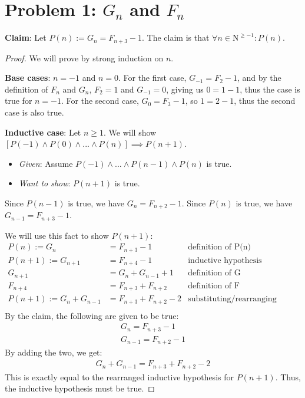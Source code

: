 \documentclass[titlepage]{article}
\begin{document}
 \maketitle

\section{Problem 1: $G_n$ and $F_n$}

\textbf{Claim}: Let $P(n) := G_n = F_{n+3} - 1$.  The claim is that $\forall n \in \mathrm{N}^{\geq -1}: P(n)$.

\begin{proof}
We will prove by strong induction on $n$.

\textbf{Base cases}: $n=-1$ and $n=0$.  For the first case, $G_{-1} = F_{2}-1$, and by the definition of $F_n$ and $G_n$, $F_2 = 1$ and $G_{-1} = 0$, giving us $0 = 1 - 1$, thus the case is true for $n=-1$. For the second case, $G_0 = F_3 - 1$, so $1 = 2 - 1$, thus the second case is also true.


\textbf{Inductive case}: Let $n \geq 1$.  We will show $[P(-1) \land P(0) \land ... \land P(n)] \implies P(n+1)$.
\begin{itemize}
\item \emph{Given}: Assume $P(-1) \land ... \land P(n-1) \land P(n)$ is true.
\item \emph{Want to show}: $P(n+1)$ is true.
\end{itemize}
Since $P(n-1)$ is true, we have
$G_{n} = F_{n+2} - 1$.
Since $P(n)$ is true, we have
$G_{n-1} = F_{n+3} - 1$.

We will use this fact to show $P(n+1)$:
\begin{align*}
P(n) := G_{n} &= F_{n+3} - 1 & \text{definition of P(n)} \\
P(n+1) := G_{n+1} &= F_{n+4} - 1 & \text{inductive hypothesis} \\
G_{n+1} &= G_n + G_{n-1} + 1 & \text{definition of G} \\
F_{n+4} &= F_{n+3} + F_{n+2} & \text{definition of F} \\
P(n+1) := G_n + G_{n-1}&= F_{n+3} + F_{n+2} - 2 & \text{substituting/rearranging terms} \\
\end{align*}
By the claim, the following are given to be true:\\
\begin{align*}
G_{n} = F_{n+3} - 1 \\ 
G_{n-1} = F_{n+2} - 1
\end{align*}
By adding the two, we get:\\
\begin{align*}
G_n + G_{n-1}= F_{n+3} + F_{n+2} - 2
\end{align*}
This is exactly equal to the rearranged inductive hypothesis for $P(n+1)$. Thus, the inductive hypothesis must be true.
\end{proof}
\end{document}
